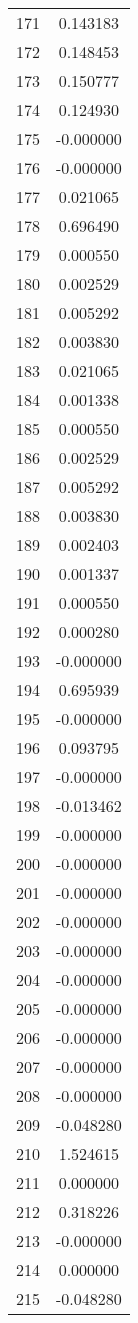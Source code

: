 \documentclass[12pt]{article}
\begin{document}
\begin{longtable}{@{}cc@{}}
171 & 0.143183 \\
172 & 0.148453 \\
173 & 0.150777 \\
174 & 0.124930 \\
175 & -0.000000 \\
176 & -0.000000 \\
177 & 0.021065 \\
178 & 0.696490 \\
179 & 0.000550 \\
180 & 0.002529 \\
181 & 0.005292 \\
182 & 0.003830 \\
183 & 0.021065 \\
184 & 0.001338 \\
185 & 0.000550 \\
186 & 0.002529 \\
187 & 0.005292 \\
188 & 0.003830 \\
189 & 0.002403 \\
190 & 0.001337 \\
191 & 0.000550 \\
192 & 0.000280 \\
193 & -0.000000 \\
194 & 0.695939 \\
195 & -0.000000 \\
196 & 0.093795 \\
197 & -0.000000 \\
198 & -0.013462 \\
199 & -0.000000 \\
200 & -0.000000 \\
201 & -0.000000 \\
202 & -0.000000 \\
203 & -0.000000 \\
204 & -0.000000 \\
205 & -0.000000 \\
206 & -0.000000 \\
207 & -0.000000 \\
208 & -0.000000 \\
209 & -0.048280 \\
210 & 1.524615 \\
211 & 0.000000 \\
212 & 0.318226 \\
213 & -0.000000 \\
214 & 0.000000 \\
215 & -0.048280 \\

\end{longtable}
\end{document}
